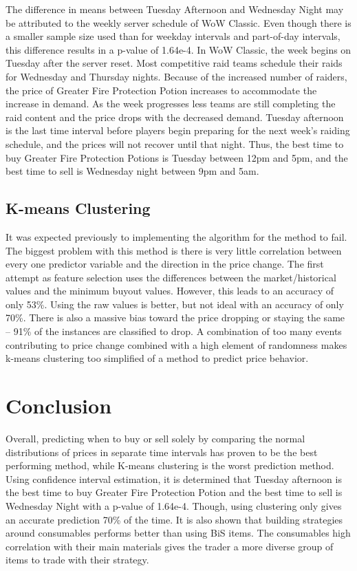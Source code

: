 \documentclass[sigconf]{acmart}
\begin{document}
The difference in means between Tuesday Afternoon and Wednesday Night may be attributed to the weekly server schedule of WoW Classic. Even though there is a smaller sample size used than for weekday intervals and part-of-day intervals, this difference results in a p-value of 1.64e-4. In WoW Classic, the week begins on Tuesday after the server reset. Most competitive raid teams schedule their raids for Wednesday and Thursday nights. Because of the increased number of raiders, the price of Greater Fire Protection Potion increases to accommodate the increase in demand. As the week progresses less teams are still completing the raid content and the price drops with the decreased demand. Tuesday afternoon is the last time interval before players begin preparing for the next week’s raiding schedule, and the prices will not recover until that night. Thus, the best time to buy Greater Fire Protection Potions is Tuesday between 12pm and 5pm, and the best time to sell is Wednesday night between 9pm and 5am.

\subsection{K-means Clustering}

It was expected previously to implementing the algorithm for the method to fail. The biggest problem with this method is there is very little correlation between every one predictor variable and the direction in the price change. The first attempt as feature selection uses the differences between the market/historical values and the minimum buyout values. However, this leads to an accuracy of only 53\%. Using the raw values is better, but not ideal with an accuracy of only 70\%. There is also a massive bias toward the price dropping or staying the same – 91\% of the instances are classified to drop. A combination of too many events contributing to price change combined with a high element of randomness makes k-means clustering too simplified of a method to predict price behavior.

\section{Conclusion}

Overall, predicting when to buy or sell solely by comparing the normal distributions of prices in separate time intervals has proven to be the best performing method, while K-means clustering is the worst prediction method. Using confidence interval estimation, it is determined that Tuesday afternoon is the best time to buy Greater Fire Protection Potion and the best time to sell is Wednesday Night with a p-value of 1.64e-4. Though, using clustering only gives an accurate prediction 70\% of the time. It is also shown that building strategies around consumables performs better than using BiS items. The consumables high correlation with their main materials gives the trader a more diverse group of items to trade with their strategy.
\end{document}
